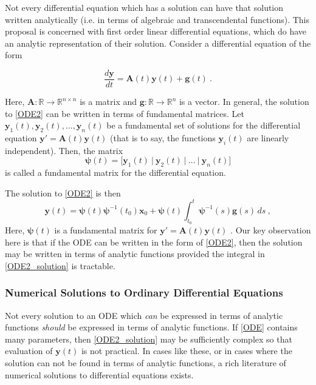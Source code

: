 Not every differential equation which has a solution can have that solution written analytically (i.e. in terms of algebraic and transcendental functions).  This proposal is concerned with first order linear differential equations, which do have an analytic representation of their solution.  Consider a differential equation of the form

\begin{equation}\label{ODE2}
\dfrac{d\mathbf{y}}{dt} = \mathbf{A}(t)\mathbf{y}(t) + \mathbf{g}(t) \>.
\end{equation}

Here, $ \mathbf{A}: \mathbb{R} \rightarrow \mathbb{R}^{n \times n} $ is a matrix and $ \mathbf{g}:  \mathbb{R} \rightarrow \mathbb{R}^n $ is a vector.  In general, the solution to \cref{ODE2} can be written in terms of fundamental matrices.  Let $ \mathbf{y}_1(t), \mathbf{y}_{2}(t), \dots , \mathbf{y}_{n}(t) $ be a fundamental set of solutions for the differential equation $ \mathbf{y}' = \mathbf{A}(t)\mathbf{y}(t) $ (that is to say, the functions $ \mathbf{y}_{i}(t) $ are linearly independent).  Then, the matrix
%
\begin{equation*}
\bm{\psi} (t)= \Big[\mathbf{y}_{1}(t) \>\vert\> \mathbf{y}_{2}(t) \>\vert\> \dots \>\vert\> \mathbf{y}_{n}(t)\Big]
\end{equation*}
% 
is called a fundamental  matrix for the differential equation.


The solution to \cref{ODE2} is then
%
\begin{equation}\label{ODE2_solution}
\mathbf{y}(t) = \bm{\psi}(t)\bm{\psi}^{-1}(t_0)\mathbf{x}_0 + \bm{\psi}(t)\int_{t_0}^{t}\bm{\psi}^{-1}(s) \mathbf{g}(s) \, ds \>,
\end{equation}
%
Here, $ \bm{\psi}(t) $ is a fundamental matrix for $\mathbf{y}' = \mathbf{A}(t)\mathbf{y}(t) $ . Our key observation here is that if  the ODE can be written in the form of \cref{ODE2}, then the solution may be written in terms of analytic functions provided the integral in \cref{ODE2_solution} is tractable.  

\subsubsection{Numerical Solutions to Ordinary Differential Equations}

Not every solution to an ODE which \textit{can} be expressed in terms of analytic functions \textit{should} be expressed in terms of analytic functions. If \cref{ODE} contains many parameters, then \cref{ODE2_solution} may be sufficiently complex so that evaluation of $\mathbf{y}(t)$ is not practical.  In cases like these, or in cases where the solution can not be found in terms of analytic functions, a rich literature of numerical solutions to differential equations exists.

